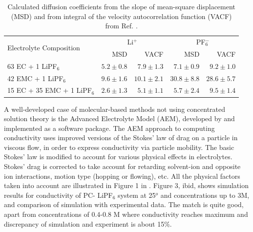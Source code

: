 \documentclass[../main.tex]{subfiles}
\begin{document}

\begin{table}[htbp]
    \caption{Calculated diffusion coefficients from the slope of mean-square displacement (MSD) and from integral of the velocity autocorrelation function (VACF) from Ref. . }
    \centering
    \begin{tabular}{|l|r|r|r|r|}
        \hline
        \multirow{2}{*}{Electrolyte Composition} & \multicolumn{2}{|c|}{Li$^+$} & \multicolumn{2}{|c|}{PF$^-_6$} \\ \cline{2-5}
        & MSD & VACF & MSD & VACF \\ \hline
        63 EC + 1 LiPF$_6$ & $5.2\pm0.8$ & $7.9\pm1.3$ & $7.1\pm0.9$ & $9.2\pm1.0$ \\ \hline
        42 EMC + 1 LiPF$_6$  & $9.6\pm1.6$ & $10.1\pm2.1$ & $30.8\pm8.8$ & $28.6\pm5.7$ \\ \hline
        15 EC + 35 EMC + 1 LiPF$_6$  & $2.6\pm1.3$ & $5.1\pm1.1$ & $5.7\pm2.4$ & $9.5\pm1.4$ \\ \hline
    \end{tabular}
    \label{tab:ong}
\end{table}



A well-developed case of molecular-based methods not using concentrated solution theory is the Advanced Electrolyte Model (AEM)\cite{Gering2006,Gering2017,Logan2018,Dave2019,Logan2020}, developed by \citeauthor{Dave2019} and implemented as a software package.\cite{Dave2019} The AEM approach to computing conductivity uses improved versions of the Stokes' law of drag on a particle in viscous flow, in order to express conductivity via particle mobility. The basic Stokes' law is modified to account for various physical effects in electrolytes. Stokes' drag is corrected to take account for retarding solvent-ion and opposite ion interactions, motion type (hopping or flowing), etc. All the physical factors taken into account are illustrated in Figure 1 in . Figure 3, ibid, shows simulation results for conductivity of PC- LiPF$_6$ system at 25$^o$ and concentrations up to 3M, and comparison of simulation with experimental data. The match is quite good, apart from concentrations of 0.4-0.8 M where conductivity reaches maximum and discrepancy of simulation and experiment is about 15\%.
\end{document}
